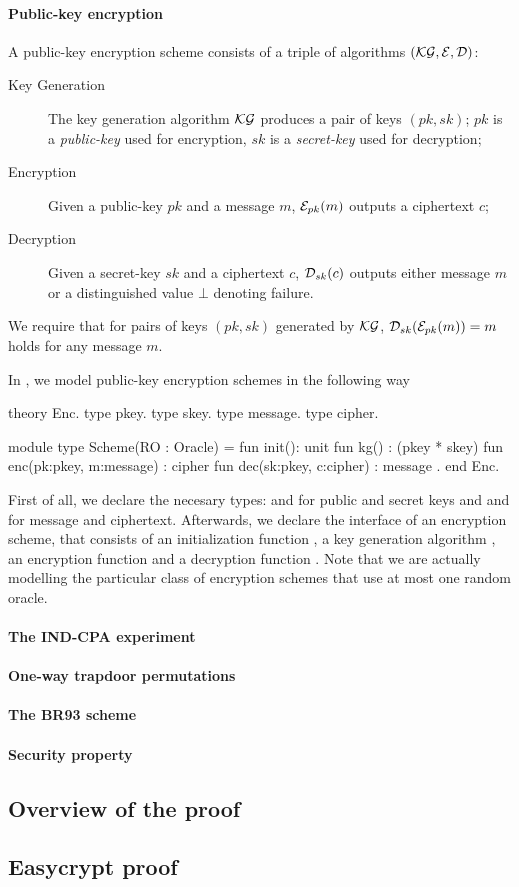 \paragraph{Public-key encryption}
A public-key encryption scheme consists of a triple of algorithms
$(\mathcal{KG},\mathcal{E},\mathcal{D})$:

\begin{description}
\item[Key Generation] 
  The key generation algorithm $\mathcal{KG}$ produces a pair of keys $(pk,sk)$;
  $pk$ is a \emph{public-key} used for encryption, $sk$ is
  a \emph{secret-key} used for decryption;

\item[Encryption] 
  Given a public-key $pk$ and a message $m$, $\mathcal{E}_{pk}(m)$ outputs a
  ciphertext $c$;

\item[Decryption] 
  Given a secret-key $sk$ and a ciphertext $c$, $\mathcal{D}_{sk}(c)$ outputs
  either message $m$ or a distinguished value $\bot$ denoting failure.
\end{description}
%
We require that for pairs of keys $(pk,sk)$ generated by $\mathcal{KG}$,
$\mathcal{D}_{sk}(\mathcal{E}_{pk}(m))= m$ holds for any message $m$. 

In \EC, we model public-key encryption schemes in the following way
\begin{easycrypt}[label={lst:enc_scheme}]{}
theory Enc.
 type pkey.
 type skey.
 type message.
 type cipher.

 module type Scheme(RO : Oracle) = {
  fun init(): unit 
  fun kg() : (pkey * skey)
  fun enc(pk:pkey, m:message) : cipher
  fun dec(sk:pkey, c:cipher) : message
 }.
end Enc.
\end{easycrypt}
First of all, we declare the necesary types:  and 
for public and secret keys and  and  for
message and ciphertext. Afterwards, we declare the interface of an
encryption scheme, that consists of an initialization function
, a key generation algorithm , an encryption function
 and a decryption function . Note that we are actually
modelling the particular class of encryption schemes that use at most
one random oracle.

\paragraph{The \textsf{IND-CPA} experiment}
\paragraph{One-way trapdoor permutations}
\paragraph{The BR93 scheme}
\paragraph{Security property}
\subsection{Overview of the proof}

\subsection{Easycrypt proof}


